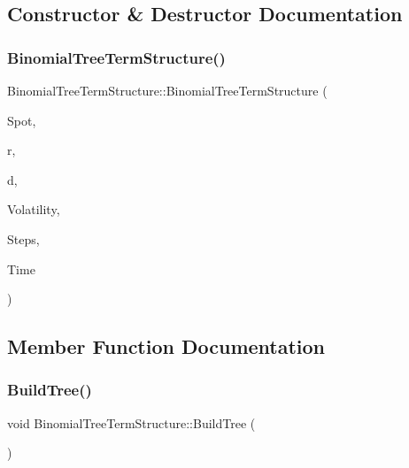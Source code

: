 \subsection{Constructor \& Destructor Documentation}
\hypertarget{classBinomialTreeTermStructure_a3f364298f038d37e9b239443f0373945}{}\label{classBinomialTreeTermStructure_a3f364298f038d37e9b239443f0373945} 
\subsubsection{\texorpdfstring{Binomial\+Tree\+Term\+Structure()}{BinomialTreeTermStructure()}}
{\footnotesize\ttfamily Binomial\+Tree\+Term\+Structure\+::\+Binomial\+Tree\+Term\+Structure (\begin{DoxyParamCaption}\item[{double}]{Spot,  }\item[{const \hyperlink{classParameters}{Parameters} \&}]{r,  }\item[{const \hyperlink{classParameters}{Parameters} \&}]{d,  }\item[{std\+::vector$<$ \hyperlink{structVolatilityTermStructure}{Volatility\+Term\+Structure} $>$}]{Volatility,  }\item[{unsigned long}]{Steps,  }\item[{double}]{Time }\end{DoxyParamCaption})}



\subsection{Member Function Documentation}
\hypertarget{classBinomialTreeTermStructure_a7cfa6b6f89f80964a0294ad1d1397254}{}\label{classBinomialTreeTermStructure_a7cfa6b6f89f80964a0294ad1d1397254} 
\subsubsection{\texorpdfstring{Build\+Tree()}{BuildTree()}}
{\footnotesize\ttfamily void Binomial\+Tree\+Term\+Structure\+::\+Build\+Tree (\begin{DoxyParamCaption}{ }\end{DoxyParamCaption})\hspace{0.3cm}{\ttfamily [protected]}}

